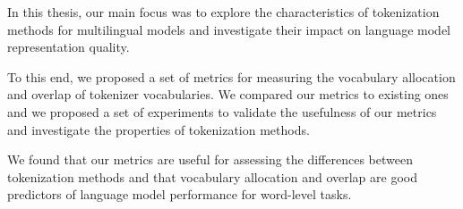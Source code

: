 




In this thesis, our main focus was to explore the characteristics of tokenization methods for multilingual models and investigate their impact on language model representation quality. 

To this end, we proposed a set of metrics for measuring the vocabulary allocation and overlap of tokenizer vocabularies. We compared our metrics to existing ones and we proposed a set of experiments to validate the usefulness of our metrics and investigate the properties of tokenization methods. 

We found that our metrics are useful for assessing the differences between tokenization methods and that vocabulary allocation and overlap are good predictors of language model performance for word-level tasks.

